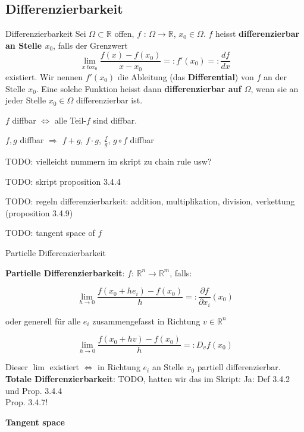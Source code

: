 
\subsection{Differenzierbarkeit}

\begin{Definition}{Differenzierbarkeit}{}
    Sei $\Omega \subset \mathbb{R}$ offen, $f$ : $\Omega \to \mathbb{R}$, $x_0\in\Omega$. $f$ heisst \textbf{differenzierbar an Stelle $x_0$}, falls der Grenzwert
    \[
    \lim_{x\ to x_0} \frac{f(x) - f(x_0)}{x - x_0} =:
    f'(x_0) =:
    \frac{df}{dx}
    \]
    existiert. Wir nennen $f'(x_0)$ die Ableitung (das \textbf{Differential}) von $f$ an der Stelle $x_0$. Eine solche Funktion heisst dann \textbf{differenzierbar auf $\Omega$}, wenn sie an jeder Stelle $x_0 \in \Omega$ differenzierbar ist.
\end{Definition}

$f$ diffbar $\Leftrightarrow$ alle Teil-$f$ sind diffbar.

$f,g$ diffbar $\Rightarrow$ $f+g$, $f \cdot g$, $\frac{f}{g}$, $g \circ f$ diffbar

TODO: vielleicht nummern im skript zu chain rule usw?

TODO: skript proposition 3.4.4

TODO: regeln differenzierbarkeit: addition, multiplikation, division, verkettung (proposition 3.4.9)

TODO: tangent space of $f$

\begin{Definition}{Partielle Differenzierbarkeit}{}
	
\end{Definition}

\textbf{Partielle Differenzierbarkeit}: $f$: $\mathbb{R}^n \rightarrow \mathbb{R}^m$, falls:

\[
    \lim_{h \rightarrow 0} \frac{f(x_0 + h e_i)-f(x_0)}{h} =: \frac{\partial f}{\partial x_i}(x_0)
\]

oder generell für alle $e_i$ zusammengefasst in Richtung $v \in \mathbb{R}^n$

\[
    \lim_{h \rightarrow 0} \frac{f(x_0 + h v)-f(x_0)}{h} =: D_v f(x_0)
\]

Dieser $\lim$ existiert $\Leftrightarrow$ in Richtung $e_i$ an Stelle $x_0$ partiell differenzierbar.\\

\textbf{Totale Differenzierbarkeit}: TODO, hatten wir das im Skript: Ja: Def 3.4.2 und Prop. 3.4.4\\

Prop. 3.4.7!

\textbf{Tangent space}

